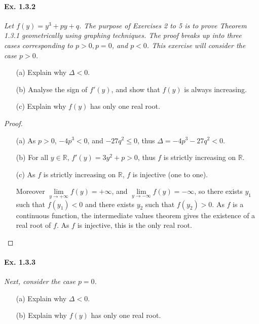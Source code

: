 \documentclass[11pt,a4paper]{article}
\begin{document}
\paragraph{Ex. 1.3.2}

{\it Let $f(y) = y^3+py+q$. The purpose of Exercises 2 to 5 is to prove Theorem 1.3.1 geometrically using graphing techniques. The proof breaks up into three cases corresponding to $p>0,p=0$, and $p<0$. This exercise will consider the case $p>0$.
\begin{enumerate}
\item[(a)] Explain why $\Delta <0$.
\item[(b)] Analyse the sign of $f'(y)$, and show that $f(y)$ is always increasing.
\item[(c)] Explain why $f(y)$ has only one real root.
\end{enumerate}
}

\begin{proof}
\begin{enumerate}
 \item[(a)]
As $p>0$, $-4p^3<0$, and $-27q^2\leq 0$, thus $\Delta = -4p^3-27q^2<0$.

\item[(b)]
For all $y\in \mathbb{R}$, $f'(y) = 3y^2+p>0$,  thus $f$ is strictly increasing on $\mathbb{R}$.

\item[(c)]
As $f$ is strictly increasing on $\mathbb{R}$, $f$ is injective (one to one).

Moreover $\lim\limits_{y\to +\infty} f(y) = +\infty$, and $\lim\limits_{y\to -\infty} f(y) = -\infty$, so there exists $y_1$ such that $f(y_1)<0$ and there exists $y_2$ such that $f(y_2)>0$. As $f$ is a continuous function, the intermediate values theorem gives the existence of a real root of $f$. As $f$ is injective, this is the only real root.

\end{enumerate}
\end{proof}

\paragraph{Ex. 1.3.3}

{\it Next, consider the case $p=0$.
\begin{enumerate}
\item[(a)] Explain why $\Delta<0$.
\item[(b)] Explain why $f(y)$ has only one real root.
\end{enumerate}
}
\end{document}
